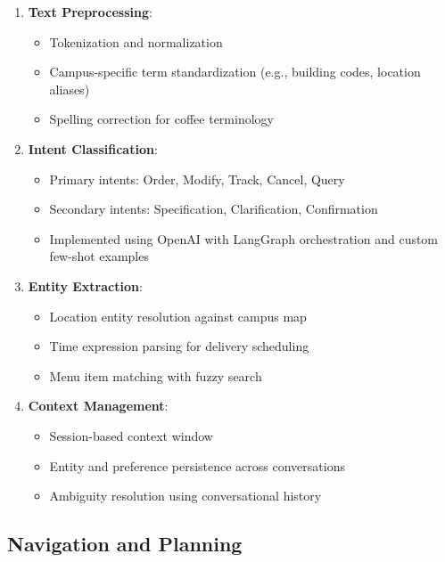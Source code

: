 \documentclass[12pt]{article}
\begin{document}
\begin{enumerate}
    \item \textbf{Text Preprocessing}:
    \begin{itemize}
        \item Tokenization and normalization
        \item Campus-specific term standardization (e.g., building codes, location aliases)
        \item Spelling correction for coffee terminology
    \end{itemize}
    
    \item \textbf{Intent Classification}:
    \begin{itemize}
        \item Primary intents: Order, Modify, Track, Cancel, Query
        \item Secondary intents: Specification, Clarification, Confirmation
        \item Implemented using OpenAI with LangGraph orchestration and custom few-shot examples
    \end{itemize}
    
    \item \textbf{Entity Extraction}:
    \begin{itemize}
        \item Location entity resolution against campus map
        \item Time expression parsing for delivery scheduling
        \item Menu item matching with fuzzy search
    \end{itemize}
    
    \item \textbf{Context Management}:
    \begin{itemize}
        \item Session-based context window
        \item Entity and preference persistence across conversations
        \item Ambiguity resolution using conversational history
    \end{itemize}
\end{enumerate}

\subsection{Navigation and Planning}
\end{document}
